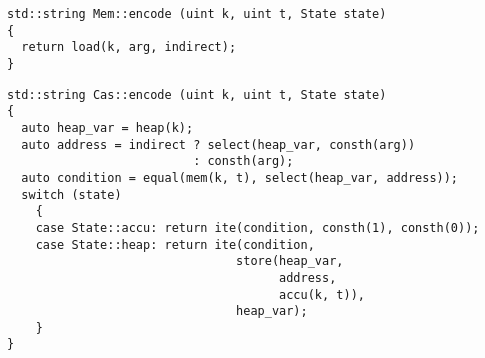 
\begin{lstlisting}[style=c++, style=encode]
std::string Mem::encode (uint k, uint t, State state)
{
  return load(k, arg, indirect);
}
\end{lstlisting}


\begin{lstlisting}[style=c++, style=encode]
std::string Cas::encode (uint k, uint t, State state)
{
  auto heap_var = heap(k);
  auto address = indirect ? select(heap_var, consth(arg))
                          : consth(arg);
  auto condition = equal(mem(k, t), select(heap_var, address));
  switch (state)
    {
    case State::accu: return ite(condition, consth(1), consth(0));
    case State::heap: return ite(condition,
                                store(heap_var,
                                      address,
                                      accu(k, t)),
                                heap_var);
    }
}
\end{lstlisting}




